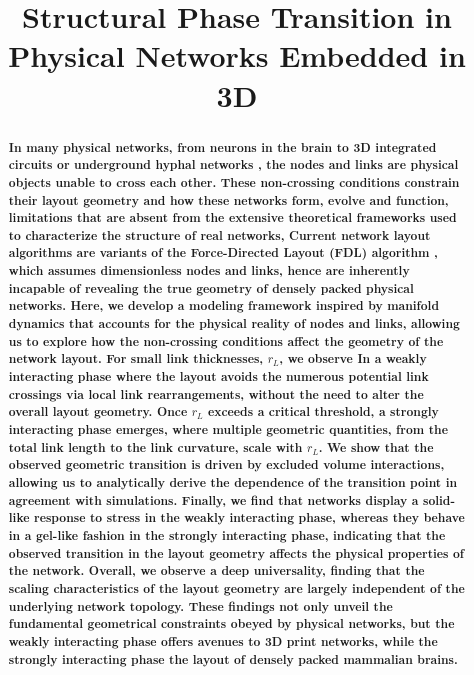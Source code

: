 \documentclass[nofootinbib,preprint,floatfix,titlepage,superscriptaddress]{revtex4} %
\newcommand{\outNim}[1]{}
\begin{document}
\linespread{1.2}
\title{\Large Structural Phase Transition in Physical Networks Embedded in 3D}
\outNim{
\medskip
\centerline{Nima Dehmamy\footnote{nidami@gmail.com}, Soodabeh Milanlouei, Albert-L\'aszl\'o Barab\'asi}
\centerline{\today}
\bigskip
}
  \begin{abstract}
{\bf 
In many physical networks, from neurons in the brain \cite{kasthuri2015saturated,oh2014mesoscale} to 3D integrated circuits \cite{wong2007monolithic,shulaker2014monolithic} %
or underground hyphal networks \cite{friese1991spread,bago1998architecture}, the nodes and links are physical objects unable to cross each other.
These non-crossing conditions constrain their layout geometry and how these networks form, evolve and function, limitations that are absent from the  
extensive theoretical frameworks used to characterize the structure of real networks\cite{barrat2008dynamical,newman2010networks,caldarelli2012networks}, %
Current network layout algorithms are variants of the Force-Directed Layout (FDL) algorithm \cite{kamada1989algorithm,davidson1996drawing,fruchterman1991graph,barnes1986hierarchical}, which assumes dimensionless nodes and links, hence are inherently incapable of revealing the true geometry of densely packed physical networks.
Here, we develop a modeling framework inspired by manifold dynamics that accounts for the physical reality of nodes and links, allowing us to 
explore how the non-crossing conditions affect the geometry of the network layout. 
For small link thicknesses, $r_L$, we observe In a weakly interacting phase where the layout avoids the numerous potential link crossings via local link rearrangements, without the need to alter the overall layout geometry. 
Once $r_L$ exceeds a critical threshold, a strongly interacting phase emerges, where multiple geometric quantities, from the total link length to the link curvature, scale with $r_L$. 
We show that the observed geometric transition is driven by excluded volume interactions, allowing us to analytically derive the dependence of the transition point in agreement with simulations.
Finally, we find that networks display a solid-like response to stress in the weakly interacting phase, whereas they behave in a gel-like fashion in the strongly interacting phase, indicating that the observed transition in the layout geometry affects the physical properties of the network. 
Overall, we 
observe a deep universality, finding that the scaling characteristics of the layout geometry are largely independent of the underlying network topology. 
These findings not only unveil the fundamental geometrical constraints obeyed by physical networks, but the weakly interacting phase offers avenues to 3D print networks, while the strongly interacting phase the layout of densely packed mammalian brains.

} 
\end{abstract}
\end{document}
